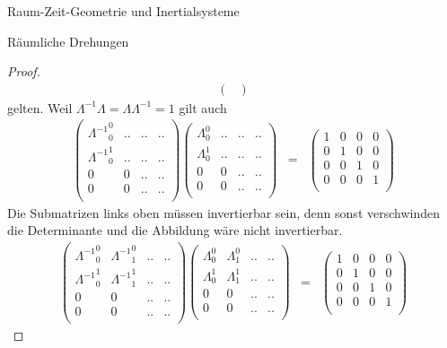 \begin{chapter}{\titlestr}
\begin{section}{Raum-Zeit-Geometrie und Inertialsysteme}
\begin{subsection}{Räumliche Drehungen}
\begin{proof}
\begin{eqnarray*}
\begin{pmatrix}
\end{pmatrix}
\end{eqnarray*}
gelten. Weil $\Lambda^{-1}\Lambda=\Lambda\Lambda^{-1}=1$ gilt auch
\begin{eqnarray*}
\begin{pmatrix}
{\Lambda^{-1}}^0_0 &..&..&..\\
{\Lambda^{-1}}^1_0 &..&..&..\\
0&0&..&..\\
0&0&..&..\\
\end{pmatrix}
\begin{pmatrix}
\Lambda^0_0 &..&..&..\\
\Lambda^1_0 &..&..&..\\
0&0&..&..\\
0&0&..&..\\
\end{pmatrix}
&=&
\begin{pmatrix}
1 &0&0&0\\
0&1&0&0\\
0&0&1&0\\
0&0&0&1\\
\end{pmatrix}
\end{eqnarray*}
Die Submatrizen links oben müssen invertierbar sein, denn sonst verschwinden die Determinante und die Abbildung wäre nicht invertierbar.
\begin{eqnarray*}
\begin{pmatrix}
{\Lambda^{-1}}^0_0 &{\Lambda^{-1}}^0_1&..&..\\
{\Lambda^{-1}}^1_0 &{\Lambda^{-1}}^1_1&..&..\\
0&0&..&..\\
0&0&..&..\\
\end{pmatrix}
\begin{pmatrix}
\Lambda^0_0 &\Lambda^0_1&..&..\\
\Lambda^1_0 &\Lambda^1_1&..&..\\
0&0&..&..\\
0&0&..&..\\
\end{pmatrix}
&=&
\begin{pmatrix}
1 &0&0&0\\
0&1&0&0\\
0&0&1&0\\
0&0&0&1\\
\end{pmatrix}
\end{eqnarray*}

\end{proof}
\end{subsection}
\end{section}
\end{chapter}
